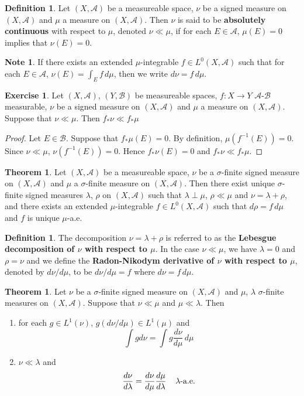 \documentclass[12pt]{amsart}
\theoremstyle{definition}
\newtheorem{defn}[definition]{Definition}
\newtheorem{note}[definition]{Note}
\newtheorem{thm}[definition]{Theorem}
\newtheorem{ex}[definition]{Exercise}
\newcommand{\lam}{\lambda}
\newcommand{\sig}{\sigma}
\newcommand{\MA}{\mathcal{A}}
\newcommand{\MB}{\mathcal{B}}
\newcommand{\dmu}{\, d \mu}
\newcommand{\ld}[1]{\label{defn:#1}}
\begin{document}
	\begin{defn} \ld{00000} 
		Let $(X, \MA)$ be a measureable space, $\nu$ be a signed measure on $(X, \MA)$ and $\mu$ a measure on $(X,\MA)$. Then $\nu$ is said to be \textbf{absolutely continuous} with respect to $\mu$, denoted $\nu \ll \mu$, if for each $E \in \MA$, $\mu(E) = 0$ implies that $\nu(E) =0$. 
	\end{defn}
	
	\begin{note}
		If there exists an extended $\mu$-integrable $f \in L^0(X, \MA)$ such that for each $E \in \MA$, $\nu(E) = \int_E f \dmu$, then we write $d\nu = f \dmu$.
	\end{note}
	
	\begin{ex}
	Let $(X, \MA)$, $(Y, \MB)$ be measureable spaces, $f:X \rightarrow Y$ $\MA$-$\MB$ measurable, $\nu$ be a signed measure on $(X, \MA)$ and $\mu$ a measure on $(X,\MA)$. Suppose that $\nu \ll \mu$. Then $f_*\nu \ll f_*\mu$
	\end{ex}
	
	\begin{proof}
	Let $E \in \MB$. Suppose that $f_*\mu(E) = 0$. By definition, $\mu(f^{-1}(E)) = 0$. Since $\nu \ll \mu$, $\nu(f^{-1}(E)) = 0$. Hence $f_*\nu(E) = 0$ and $f_*\nu \ll f_*\mu$.
	\end{proof}
	
	\begin{thm}
		Let $(X, \MA)$ be a measureable space, $\nu$ be a $\sig$-finite signed measure on $(X, \MA)$ and $\mu$ a $\sig$-finite measure on $(X,\MA)$. Then there exist unique $\sig$-finite signed measures $\lam$, $\rho$ on $(X, \MA)$ such that $\lam \perp \mu$, $\rho \ll \mu$ and $\nu = \lam + \rho$, and there exists an extended $\mu$-integrable $f \in L^0(X, \MA)$ such that $d\rho = f \dmu$ and $f$ is unique $\mu$-a.e.  
	\end{thm}
	
	\begin{defn} \ld{00000} 
		The decomposition $\nu = \lam + \rho$ is referred to as the \textbf{Lebesgue decomposition of $\nu$ with respect to $\mu$}. In the case $\nu \ll \mu$, we have $\lam = 0$ and $\rho = \nu$ and we define the \textbf{Radon-Nikodym derivative of $\nu$ with respect to $\mu$}, denoted by $d\nu/d\mu$, to be $d\nu/d\mu = f$ where $d\nu = f\dmu$.   
	\end{defn}
	
	\begin{thm}
		Let $\nu$ be a $\sig$-finite signed measure on $(X, \MA)$ and $\mu$, $\lam$ $\sig$-finite measures on $(X,\MA)$. Suppose that $\nu \ll \mu$ and $\mu \ll \lam$. Then 
		\begin{enumerate}
			\item for each $g \in L^1(\nu)$, $g(d\nu/d\mu) \in  L^1(\mu)$ and $$\int g d\nu = \int g \frac{d\nu}{d\mu} \dmu$$
			\item $\nu \ll \lam$ and $$\frac{d \nu}{d\lam} = \frac{d \nu}{d\mu} \frac{d\mu}{d\lam} \hspace{4mm} \lam \text{-a.e.}$$
		\end{enumerate}
	\end{thm}
	
\end{document}
